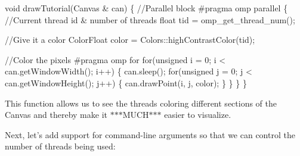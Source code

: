 \begin{DoxyCode}
\textcolor{keywordtype}{void} drawTutorial(Canvas & can) \{
  \textcolor{comment}{//Parallel block}
\textcolor{preprocessor}{  #pragma omp parallel}
\textcolor{preprocessor}{}  \{
    \textcolor{comment}{//Current thread id & number of threads}
    \textcolor{keywordtype}{float} tid = omp\_get\_thread\_num();

    \textcolor{comment}{//Give it a color}
    ColorFloat color = Colors::highContrastColor(tid);

    \textcolor{comment}{//Color the pixels}
\textcolor{preprocessor}{    #pragma omp for}
\textcolor{preprocessor}{}    \textcolor{keywordflow}{for}(\textcolor{keywordtype}{unsigned} i = 0; i < can.getWindowWidth(); i++) \{
        can.sleep();
        \textcolor{keywordflow}{for}(\textcolor{keywordtype}{unsigned} j = 0; j < can.getWindowHeight(); j++) \{
            can.drawPoint(i, j, color);
          \}
    \}
  \}
\}
\end{DoxyCode}


This function allows us to see the threads coloring different sections of the Canvas and thereby make it $\ast$$\ast$$\ast$\-M\-U\-C\-H$\ast$$\ast$$\ast$ easier to visualize.

Next, let's add support for command-\/line arguments so that we can control the number of threads being used\-:


